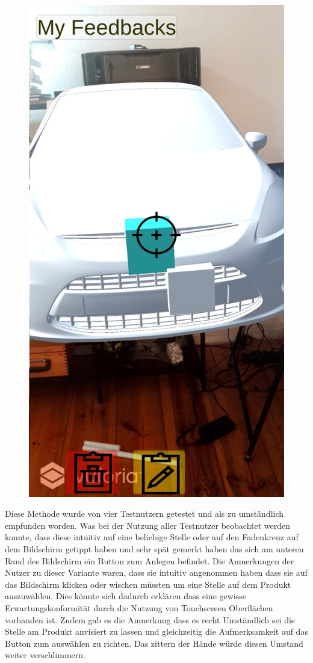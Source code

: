 \begin{figure}[H]
\begin{minipage}{.4\textwidth}
		\includegraphics[width=.65\linewidth]{resources/implementation/crossfade_edit.jpg}
		\label{fig:crossfade_edit_delete}
	\end{minipage}
\end{figure}

Diese Methode wurde von vier Testnutzern getestet und als zu umständlich empfunden worden. Was bei der Nutzung aller Testnutzer beobachtet werden konnte, dass diese intuitiv auf eine beliebige Stelle oder auf den Fadenkreuz auf dem Bildschirm 
getippt haben und sehr spät gemerkt haben das sich am unteren Rand des Bildschirm ein Button zum Anlegen befindet. Die Anmerkungen der Nutzer zu dieser Variante waren, dass sie intuitiv angenommen haben dass sie auf das Bildschirm klicken oder wischen 
müssten um eine Stelle auf dem Produkt auszuwählen. Dies könnte sich dadurch erklären dass eine gewisse Erwartungskonformität durch die Nutzung von Touchscreen Oberflächen vorhanden ist. Zudem gab es die Anmerkung dass es recht Umständlich sei die Stelle 
am Produkt anvisiert zu lassen und gleichzeitig die Aufmerksamkeit auf das Button zum auswählen zu richten. Das zittern der Hände würde diesen Umstand weiter verschlimmern. 

